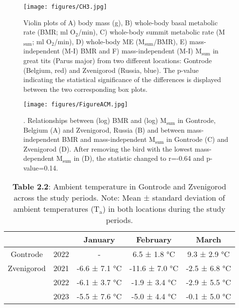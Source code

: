 \documentclass[10pt, twoside]{book} %
\begin{document}
\renewcommand{\thefigure}{2.\arabic{figure}}
	\begin{figure}[h!]
		\begin{center}
\small
			\texttt{[image: figures/CH3.jpg]}
		\end{center}
		\begin{footnotesize}
			\caption{\footnotesize Violin plots of A) body mass (g), B) whole-body basal metabolic rate (BMR; ml O$_{\text{2}}$/min), C) whole-body summit metabolic rate (M$_{\text{sum}}$; ml O$_{\text{2}}$/min), D) whole-body ME (M$_{\text{sum}}$/BMR), E) mass-independent (M-I) BMR and F) mass-independent (M-I) M$_{\text{sum}}$ in great tits (Parus major) from two different locations: Gontrode (Belgium, red) and Zvenigorod (Russia, blue). The p-value indicating the statistical significance of the differences is displayed between the two corresponding box plots.\label{fig3.1}}
		\end{footnotesize}
	\end{figure}
\clearpage

\renewcommand{\thefigure}{2.\arabic{figure}}
	\begin{figure}[h!]
		\begin{center}
\small
			\texttt{[image: figures/FigureACM.jpg]}
		\end{center}
		\begin{footnotesize}
			\caption{\footnotesize . Relationships between (log) BMR and (log) M$_{\text{sum}}$ in Gontrode, Belgium (A) and Zvenigorod, Russia (B) and between mass-independent BMR and mass-independent M$_{\text{sum}}$ in Gontrode (C) and Zvenigorod (D). After removing the bird with the lowest mass-dependent M$_{\text{sum}}$ in (D), the statistic changed to r=-0.64 and p-value=0.14.\label{fig3.2}}
		\end{footnotesize}
	\end{figure}
\clearpage

\begin{table}[!ht]
    \centering
\small
\caption*{\textbf{Table 2.2}: Ambient temperature in Gontrode and Zvenigorod across the study periods. Note: Mean ± standard deviation of ambient temperatures (T$_{\text{a}}$) in both locations during the study periods.}
\begin{adjustbox}{max width=\textwidth}    
    \begin{tabular}{ccccc}
    \hline
        ~ & ~ & January & February & March \\ \hline
        Gontrode & 2022 & - & 6.5 ± 1.8 °C & 9.3 ± 2.9 °C \\ 
        Zvenigorod & 2021 & -6.6 ± 7.1 °C & -11.6 ± 7.0 °C & -2.5 ± 6.8 °C \\ 
        ~ & 2022 & -6.1 ± 3.7 °C & -1.9 ± 3.4 °C & -2.9 ± 5.5 °C \\ 
        ~ & 2023 & -5.5 ± 7.6 °C & -5.0 ± 4.4 °C & -0.1 ± 5.0 °C \\ \hline
    \end{tabular}
\end{adjustbox}
\end{table}
\clearpage
\end{document}
